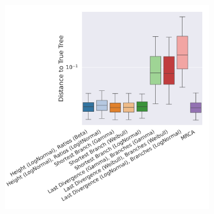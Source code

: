 \documentclass[10pt,letterpaper]{article}
\begin{document}
\begin{figure}
	\begin{subfigure}[b]{0.45\textwidth}
		\centering
		\includegraphics[width=\textwidth]{figures/yule-400-ccd1-point-estimates.png}
	\end{subfigure}
	
	\label{fig:accuracy-point-estimators}
\end{figure}
\end{document}
